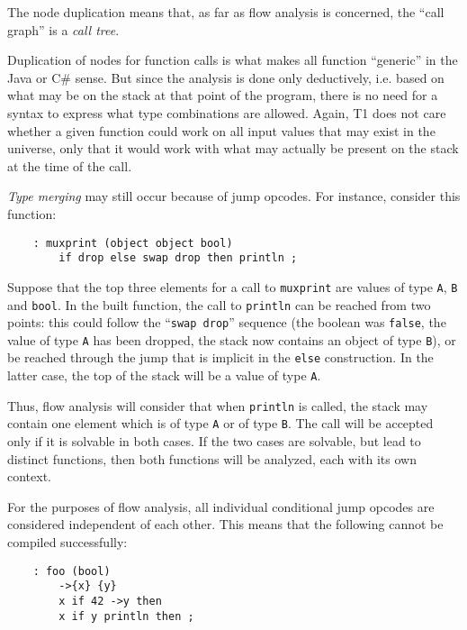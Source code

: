 The node duplication means that, as far as flow analysis is concerned,
the ``call graph'' is a \emph{call tree}.

\begin{rationale}
Duplication of nodes for function calls is what makes all function
``generic'' in the Java or C\# sense. But since the analysis is done
only deductively, i.e. based on what may be on the stack at that
point of the program, there is no need for a syntax to express what
type combinations are allowed. Again, T1 does not care whether a given
function could work on all input values that may exist in the universe,
only that it would work with what may actually be present on the stack
at the time of the call.
\end{rationale}

\emph{Type merging} may still occur because of jump opcodes. For
instance, consider this function:

\begin{verbatim}
    : muxprint (object object bool)
        if drop else swap drop then println ;
\end{verbatim}

Suppose that the top three elements for a call to \verb|muxprint| are
values of type \verb|A|, \verb|B| and \verb|bool|. In the built function,
the call to \verb|println| can be reached from two points: this could
follow the ``\verb|swap drop|'' sequence (the boolean was \verb|false|,
the value of type \verb|A| has been dropped, the stack now contains an
object of type \verb|B|), or be reached through the jump that is implicit
in the \verb|else| construction. In the latter case, the top of the stack
will be a value of type \verb|A|.

Thus, flow analysis will consider that when \verb|println| is called,
the stack may contain one element which is of type \verb|A| or of type
\verb|B|. The call will be accepted only if it is solvable in both
cases. If the two cases are solvable, but lead to distinct functions,
then both functions will be analyzed, each with its own context.

For the purposes of flow analysis, all individual conditional jump
opcodes are considered independent of each other. This means that
the following cannot be compiled successfully:

\begin{verbatim}
    : foo (bool)
        ->{x} {y}
        x if 42 ->y then
        x if y println then ;
\end{verbatim}

